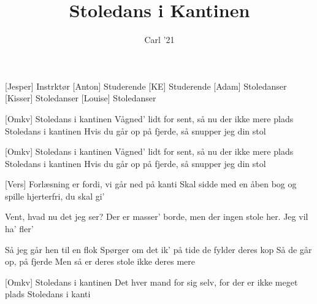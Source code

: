 \documentclass[a4paper,11pt]{article}
\title{Stoledans i Kantinen}
\author{Carl '21}
\begin{document}
\maketitle

\begin{roles}
[Jesper] Instrktør
[Anton] Studerende
[KE] Studerende
[Adam] Stoledanser
[Kisser] Stoledanser
[Louise] Stoledanser
\end{roles}

\begin{song}
  
  [Omkv]%
  Stoledans i kantinen
  				Vågned' lidt for sent, så nu der ikke mere plads
  				Stoledans i kantinen
  				Hvis du går op på fjerde, så snupper jeg din stol
      
  [Omkv]%
  Stoledans i kantinen
  				Vågned' lidt for sent, så nu der ikke mere plads
  				Stoledans i kantinen
  				Hvis du går op på fjerde, så snupper jeg din stol      
  	
  [Vers]%
  Forlæsning er fordi, vi går ned på kanti
  				Skal sidde med en åben bog og spille hjerterfri,
  				du skal gi'
  				
  				Vent, hvad nu det jeg ser?
  				Der er masser' borde, men der ingen stole her.
  				Jeg vil ha' fler'
  				
  				Så jeg går hen til en flok
  				Spørger om det ik' på tide de fylder deres kop
  				Så de går op, på fjerde
  				Men så er deres stole ikke deres mere
 

  [Omkv]%
  Stoledans i kantinen
  				Det hver mand for sig selv, for der er ikke meget plads
  				Stoledans i kanti 

\end{song}
\end{document}
